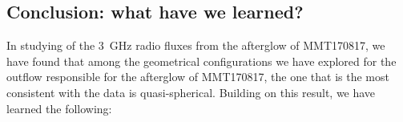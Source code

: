 

\subsection{Conclusion: what have we learned?}

In studying of the 3~GHz radio fluxes from the afterglow of MMT170817, we have found that among the geometrical configurations we have explored for the outflow responsible for the afterglow of MMT170817, the one that is the most consistent with the data is  quasi-spherical. Building on this result, we have learned the following:

